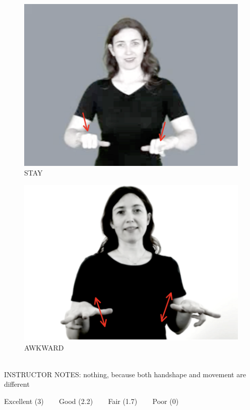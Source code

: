 \documentclass[12pt]{article}
\begin{document}
\begin{figure}[H]
\includegraphics{../images/asl_stay.png}
\caption{STAY}
\end{figure}
\begin{figure}[H]
\includegraphics{../images/asl_awkward.png}
\caption{AWKWARD}
\end{figure}

~\\
INSTRUCTOR NOTES: nothing, because both handshape and movement are different


\vfill
Excellent (3) ~~~ Good (2.2) ~~~ Fair (1.7) ~~~ Poor (0)
\newpage

\begin{center}
\textbf{{\color{red}{\HUGE END OF EXAM}}}\\

\end{center}
\newpage
\end{document}
